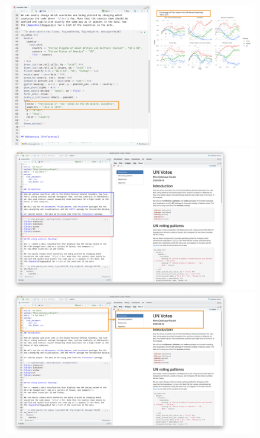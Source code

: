 \documentclass[11pt]{beamer}
\begin{document}
\begin{frame}
\begin{figure}
\begin{overprint}
				\centering\includegraphics[width=0.9\linewidth]{Images/S1/unvotes/unvotes-12}	
				\onslide<6>\centering\includegraphics[width=0.9\linewidth]{Images/S1/unvotes/unvotes-13}	
				\onslide<7>\centering\includegraphics[width=0.9\linewidth]{Images/S1/unvotes/unvotes-14}	
			
			\end{overprint}
		\end{figure}
		
	\end{frame}
	
	
\end{document}
